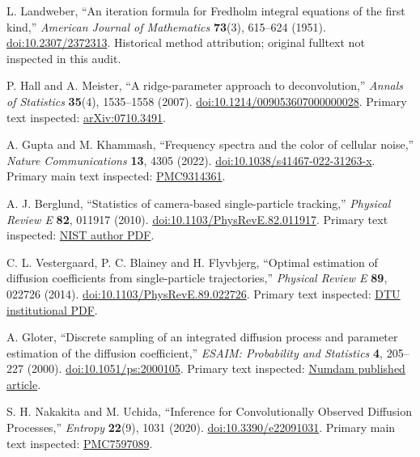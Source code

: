 L. Landweber,
``An iteration formula for Fredholm integral equations of the first kind,''
\emph{American Journal of Mathematics} \textbf{73}(3), 615--624 (1951).
\href{https://doi.org/10.2307/2372313}{doi:10.2307/2372313}.
Historical method attribution; original fulltext not inspected in this audit.

P. Hall and A. Meister,
``A ridge-parameter approach to deconvolution,''
\emph{Annals of Statistics} \textbf{35}(4), 1535--1558 (2007).
\href{https://doi.org/10.1214/009053607000000028}{doi:10.1214/009053607000000028}.
Primary text inspected: \href{https://arxiv.org/abs/0710.3491}{arXiv:0710.3491}.

A. Gupta and M. Khammash,
``Frequency spectra and the color of cellular noise,''
\emph{Nature Communications} \textbf{13}, 4305 (2022).
\href{https://doi.org/10.1038/s41467-022-31263-x}{doi:10.1038/s41467-022-31263-x}.
Primary main text inspected:
\href{https://pmc.ncbi.nlm.nih.gov/articles/PMC9314361/}{PMC9314361}.

A. J. Berglund,
``Statistics of camera-based single-particle tracking,''
\emph{Physical Review E} \textbf{82}, 011917 (2010).
\href{https://doi.org/10.1103/PhysRevE.82.011917}{doi:10.1103/PhysRevE.82.011917}.
Primary text inspected:
\href{https://tsapps.nist.gov/publication/get_pdf.cfm?pub_id=905460}{NIST author PDF}.

C. L. Vestergaard, P. C. Blainey and H. Flyvbjerg,
``Optimal estimation of diffusion coefficients from single-particle trajectories,''
\emph{Physical Review E} \textbf{89}, 022726 (2014).
\href{https://doi.org/10.1103/PhysRevE.89.022726}{doi:10.1103/PhysRevE.89.022726}.
Primary text inspected:
\href{https://backend.orbit.dtu.dk/ws/files/90238574/PhysRevE.89.022726.pdf}{DTU institutional PDF}.

A. Gloter,
``Discrete sampling of an integrated diffusion process and parameter estimation
of the diffusion coefficient,''
\emph{ESAIM: Probability and Statistics} \textbf{4}, 205--227 (2000).
\href{https://doi.org/10.1051/ps:2000105}{doi:10.1051/ps:2000105}.
Primary text inspected:
\href{https://numdam.org/item/PS_2000__4__205_0/}{Numdam published article}.

S. H. Nakakita and M. Uchida,
``Inference for Convolutionally Observed Diffusion Processes,''
\emph{Entropy} \textbf{22}(9), 1031 (2020).
\href{https://doi.org/10.3390/e22091031}{doi:10.3390/e22091031}.
Primary main text inspected:
\href{https://pmc.ncbi.nlm.nih.gov/articles/PMC7597089/}{PMC7597089}.

